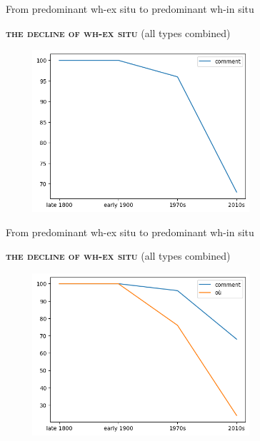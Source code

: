 \documentclass[lesson_slides]{subfiles}
\begin{document}
\begin{frame}[c]{From predominant wh-ex situ to predominant wh-in situ}

    \textbf{\textsc{the decline of wh-ex situ}} (all types combined)
    \begin{center}
        \includegraphics[width=10cm, height=6cm]{images/one.png}
    \end{center}
  
\end{frame}
\begin{frame}[c]{From predominant wh-ex situ to predominant wh-in situ}

    \textbf{\textsc{the decline of wh-ex situ}} (all types combined)
    \begin{center}
        \includegraphics[width=10cm, height=6cm]{images/two.png}
    \end{center}
  
\end{frame}
\end{document}
